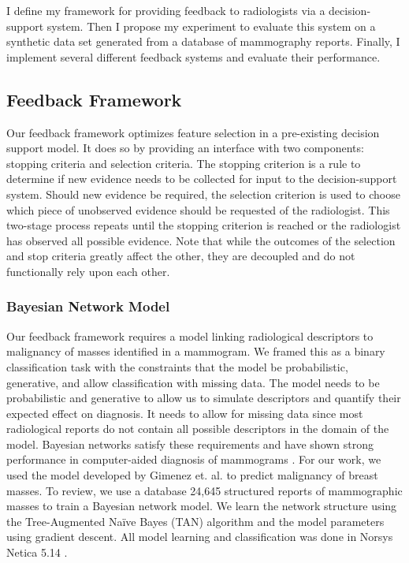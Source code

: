 I define my framework for providing feedback to radiologists via a decision-support system.
Then I propose my experiment to evaluate this system on a synthetic data set generated from a database of mammography reports.
Finally, I implement several different feedback systems and evaluate their performance.

\subsection{Feedback Framework}
Our feedback framework optimizes feature selection in a pre-existing decision support model.
It does so by providing an interface with two components: stopping criteria and selection criteria.
The stopping criterion is a rule to determine if new evidence needs to be collected for input to the decision-support system.
Should new evidence be required, the selection criterion is used to choose which piece of unobserved evidence should be requested of the radiologist.
This two-stage process repeats until the stopping criterion is reached or the radiologist has observed all possible evidence.
Note that while the outcomes of the selection and stop criteria greatly affect the other, they are decoupled and do not functionally rely upon each other.

\subsubsection{Bayesian Network Model}
Our feedback framework requires a model linking radiological descriptors to malignancy of masses identified in a mammogram.
We framed this as a binary classification task with the constraints that the model be probabilistic, generative, and allow classification with missing data.
The model needs to be probabilistic and generative to allow us to simulate descriptors and quantify their expected effect on diagnosis.
It needs to allow for missing data since most radiological reports do not contain all possible descriptors in the domain of the model.
Bayesian networks satisfy these requirements and have shown strong performance in computer-aided diagnosis of mammograms \cite{Burnside:2000wl, ElizabethS:2005gc, Rubin:2005jg, Koller:2009wk, Burnside:2009br}.
For our work, we used the model developed by Gimenez et. al. \cite{Gimenez:2014tr} to predict malignancy of breast masses.
To review, we use a database 24,645 structured reports of mammographic masses to train a Bayesian network model.
We learn the network structure using the Tree-Augmented Na\"{i}ve Bayes (TAN) algorithm and the model parameters using gradient descent.
All model learning and classification was done in Norsys Netica 5.14 \cite{Norsys:1998vl}.



